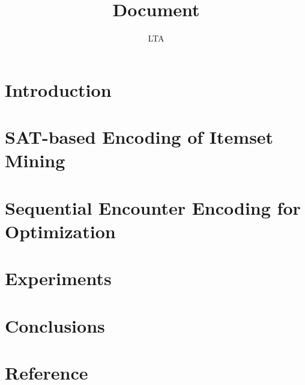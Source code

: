 \documentclass[13pt,a4paper]{report}
\title{Document}
\author{LTA}
\begin{document}










\fontsize{13}{15}\selectfont

\chapter{Introduction}





\chapter{SAT-based Encoding of Itemset Mining}




\chapter{Sequential Encounter Encoding for Optimization}



\chapter{Experiments}



\chapter{Conclusions}



\chapter*{Reference}
\nocite{*}
\printbibliography
\end{document}

